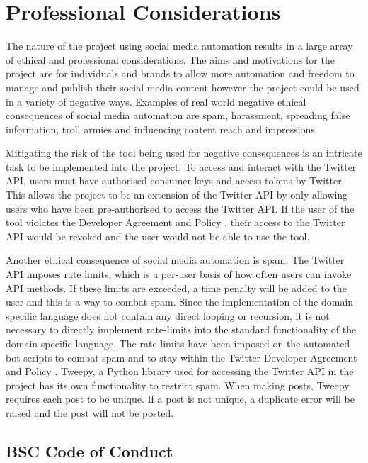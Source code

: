 \chapter{Professional Considerations}

The nature of the project using social media automation results in a large array of ethical and professional considerations. The aims and motivations for the project are for individuals and brands to allow more automation and freedom to manage and publish their social media content however the project could be used in a variety of negative ways. Examples of real world negative ethical consequences of social media automation are spam, harassment, spreading false information, troll armies and influencing content reach and impressions. \newline \par

Mitigating the risk of the tool being used for negative consequences is an intricate task to be implemented into the project. To access and interact with the Twitter API, users must have authorised consumer keys and access tokens by Twitter. This allows the project to be an extension of the Twitter API by only allowing users who have been pre-authorised to access the Twitter API. If the user of the tool violates the Developer Agreement and Policy \cite{DeveloperPolicy}, their access to the Twitter API would be revoked and the user would not be able to use the tool. \newline \par

Another ethical consequence of social media automation is spam. The Twitter API imposes rate limits, which is a per-user basis of how often users can invoke API methods. If these limits are exceeded, a time penalty will be added to the user and this is a way to combat spam. Since the implementation of the domain specific language does not contain any direct looping or recursion, it is not necessary to directly implement rate-limits into the standard functionality of the domain specific language. The rate limits have been imposed on the automated bot scripts to combat spam and to stay within the Twitter Developer Agreement and Policy \cite{DeveloperPolicy}. Tweepy, a Python library used for accessing the Twitter API in the project has its own functionality to restrict spam. When making posts, Tweepy requires each post to be unique. If a post is not unique, a duplicate error will be raised and the post will not be posted.

\section{BSC Code of Conduct}

